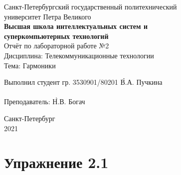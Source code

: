 \documentclass[a4paper, 14pt]{extarticle}
\begin{document}
    \begin{center}
        \begin{center}
            \hfill \break
            \normalsize{Санкт-Петербургский государственный политехнический}\\
            \normalsize{университет Петра Великого}\\
            \hfill \break
            \normalsize{\textbf{Высшая школа интеллектуальных систем и}}\\
            \normalsize{\textbf{суперкомпьютерных технологий}}\\
            \hfill \break
            \hfill \break
            \hfill \break
            \hfill \break
            \hfill \break
            \normalsize{Отчёт по лабораторной работе №2}\\
            \normalsize{Дисциплина: Телекоммуникационные технологии}\\
            \normalsize{Тема: Гармоники}\\
        \end{center}
        \hfill \break
        \hfill \break
        \hfill \break
        \hfill \break
        \hfill \break
        \hfill \break
        \hfill \break
        \hfill \break
        \hfill \break
        \hfill \break
        \begin{tabbing}
            Выполнил студент гр. 3530901/80201 \`В.А. Пучкина\\
            \\
            Преподаватель: \`Н.В. Богач\\
        \end{tabbing}
        \hfill \break
        \hfill \break
        \hfill \break
        \hfill \break
        \begin{center}
            Санкт-Петербург\\
            2021
        \end{center}
        \thispagestyle{empty}
    \end{center}

    \newpage
    \tableofcontents

    \newpage
    \listoffigures

    \newpage
    \lstlistoflistings

    \newpage
    \section{Упражнение 2.1}
    \label{sec:task1}
\end{document}
